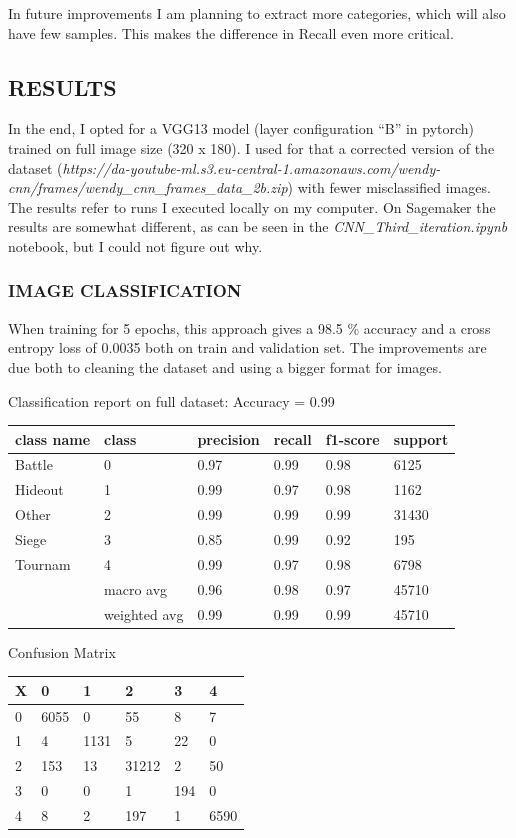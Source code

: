\documentclass[
]{article}
\begin{document}
In future improvements I am planning to extract more categories, which
will also have few samples. This makes the difference in Recall even
more critical.

\hypertarget{results-1}{%
\subsection{RESULTS}\label{results-1}}

In the end, I opted for a VGG13 model (layer configuration ``B'' in
pytorch) trained on full image size (320 x 180). I used for that a
corrected version of the dataset
(\emph{https://da-youtube-ml.s3.eu-central-1.amazonaws.com/wendy-cnn/frames/wendy\_cnn\_frames\_data\_2b.zip})
with fewer misclassified images. The results refer to runs I executed
locally on my computer. On Sagemaker the results are somewhat different,
as can be seen in the \emph{CNN\_Third\_iteration.ipynb} notebook, but I
could not figure out why.

\hypertarget{image-classification-1}{%
\subsubsection{IMAGE CLASSIFICATION}\label{image-classification-1}}

When training for 5 epochs, this approach gives a 98.5 \% accuracy and a
cross entropy loss of 0.0035 both on train and validation set. The
improvements are due both to cleaning the dataset and using a bigger
format for images.

Classification report on full dataset: Accuracy = 0.99

\begin{longtable}[]{@{}llllll@{}}
\toprule
class name & class & precision & recall & f1-score &
support\tabularnewline
\midrule
\endhead
Battle & 0 & 0.97 & 0.99 & 0.98 & 6125\tabularnewline
Hideout & 1 & 0.99 & 0.97 & 0.98 & 1162\tabularnewline
Other & 2 & 0.99 & 0.99 & 0.99 & 31430\tabularnewline
Siege & 3 & 0.85 & 0.99 & 0.92 & 195\tabularnewline
Tournam & 4 & 0.99 & 0.97 & 0.98 & 6798\tabularnewline
& macro avg & 0.96 & 0.98 & 0.97 & 45710\tabularnewline
& weighted avg & 0.99 & 0.99 & 0.99 & 45710\tabularnewline
\bottomrule
\end{longtable}

Confusion Matrix

\begin{longtable}[]{@{}llllll@{}}
\toprule
X & 0 & 1 & 2 & 3 & 4\tabularnewline
\midrule
\endhead
0 & 6055 & 0 & 55 & 8 & 7\tabularnewline
1 & 4 & 1131 & 5 & 22 & 0\tabularnewline
2 & 153 & 13 & 31212 & 2 & 50\tabularnewline
3 & 0 & 0 & 1 & 194 & 0\tabularnewline
4 & 8 & 2 & 197 & 1 & 6590\tabularnewline
\bottomrule
\end{longtable}
\end{document}
